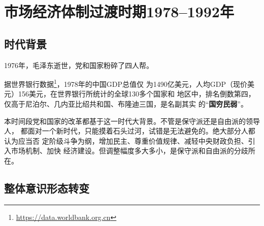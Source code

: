 \chapter{市场经济体制过渡时期1978--1992年}
\label{chap:1978}

\section{时代背景}


1976年，毛泽东逝世，党和国家粉碎了四人帮。

据世界银行数据\footnote{\url{https://data.worldbank.org.cn}}，1978年的中国GDP总值仅
为1490亿美元，人均GDP（现价美元）156美元，在世界银行所统计的全球130多个国家和
地区中，排名倒数第四，仅高于尼泊尔、几内亚比绍共和国、布隆迪三国，是名副其实
的“\textbf{国穷民弱}”。

本时间段党和国家的改革都基于这一时代大背景。不管是保守派还是自由派的领导人，
都面对一个新时代，只能摸着石头过河，试错是无法避免的。绝大部分人都认为应当否
定阶级斗争为纲，增加民主、尊重价值规律、减轻中央财政负担、引入市场机制、加快
经济建设。但调整幅度多大多小，是保守派和自由派的分歧所在。


\section{整体意识形态转变}

